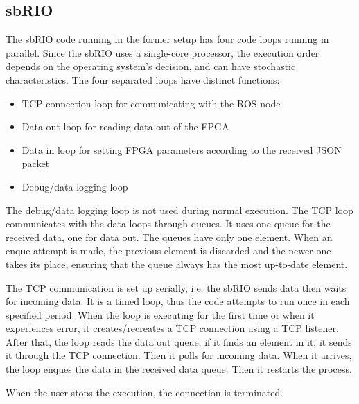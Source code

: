 \subsection{sbRIO}\label{sec:sbrio}


The sbRIO code running in the former setup has four code loops running in parallel. Since the sbRIO uses a single-core processor, the execution order depends on the operating system's decision, and can have stochastic characteristics. The four separated loops have distinct functions:

\begin{itemize}
	\item TCP connection loop for communicating with the ROS node
	\item Data out loop for reading data out of the FPGA
	\item Data in loop for setting FPGA parameters according to the received JSON packet
	\item Debug/data logging loop
\end{itemize}

The debug/data logging loop is not used during normal execution. The TCP loop communicates with the data loops through queues. It uses one queue for the received data, one for data out. The queues have only one element. When an enque attempt is made, the previous element is discarded and the newer one takes its place, ensuring that the queue always has the most up-to-date element.

The TCP communication is set up serially, i.e. the sbRIO sends data then waits for incoming data. It is a timed loop, thus the code attempts to run once in each specified period. When the loop is executing for the first time or when it experiences error, it creates/recreates a TCP connection using a TCP listener. After that, the loop reads the data out queue, if it finds an element in it, it sends it through the TCP connection. Then it polls for incoming data. When it arrives, the loop enques the data in the received data queue. Then it restarts the process.

When the user stops the execution, the connection is terminated.